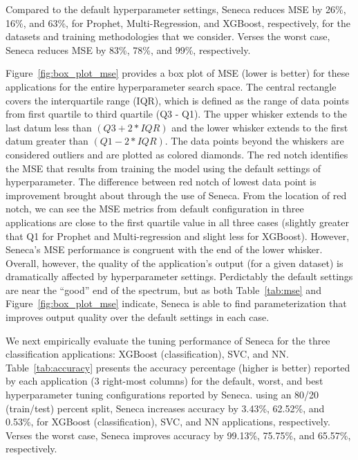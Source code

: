 Compared to the default hyperparameter settings,
Seneca reduces MSE by 26\%, 16\%, and 63\%, for Prophet, Multi-Regression, and XGBoost,
respectively, for the datasets and training methodologies that we consider.
Verses the worst case, Seneca reduces MSE by 83\%, 78\%, and 99\%, respectively.

Figure~\ref{fig:box_plot_mse} provides a box plot of MSE (lower is better) for
these applications for the entire hyperparameter search space. The central
rectangle covers the interquartile range (IQR), which is defined as the range
of data points from first quartile to third quartile (Q3 - Q1).  The upper
whisker extends to the last datum less than \texttt{$(Q3 + 2 * IQR)$} and the
lower whisker extends to the first datum greater than \texttt{$(Q1 - 2 *
IQR)$}. The data points beyond the whiskers are considered outliers and are
plotted as colored diamonds. The red notch identifies the MSE that results
from training the model using the default settings of hyperparameter. The
difference between red notch of lowest data point is improvement brought about
through the use of Seneca. From the location of red notch, we can see the MSE
metrics from default configuration in three applications are close to the
first quartile value in all three cases (slightly greater that Q1 for Prophet
and Multi-regression and slight less for XGBoost). However, Seneca's MSE
performance is congruent with the end of the lower whisker.  Overall, however,
the quality of the application's output (for a given dataset) is dramatically
affected by hyperparameter settings.  Perdictably the default settings are
near the ``good'' end of the spectrum, but as both Table~\ref{tab:mse} and
Figure~\ref{fig:box_plot_mse} indicate, Seneca is able to find
parameterization that improves output quality over the default settings
in each case.

We next empirically evaluate the tuning performance of Seneca for the three
classification applications: XGBoost (classification), SVC, and NN.
Table~\ref{tab:accuracy} presents the accuracy percentage (higher is
better) reported by each application (3 right-most columns) for the default,
worst, and best hyperparameter tuning configurations reported by Seneca.
using an 80/20 (train/test) percent split,
Seneca increases accuracy by 3.43\%, 62.52\%, and 0.53\%, for XGBoost
(classification), SVC, and NN applications, respectively.  Verses
the worst case, Seneca improves accuracy by 99.13\%, 75.75\%, and 65.57\%,
respectively.


